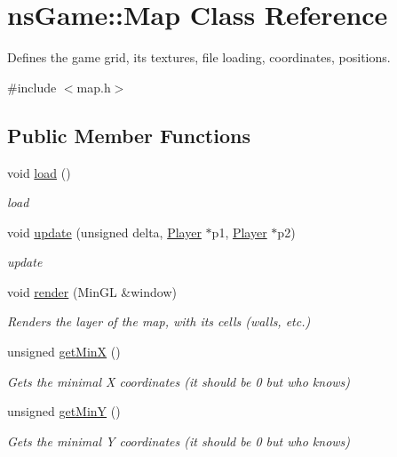 \hypertarget{classns_game_1_1_map}{}\section{ns\+Game\+:\+:Map Class Reference}
\label{classns_game_1_1_map}


Defines the game grid, its textures, file loading, coordinates, positions.  




{\ttfamily \#include $<$map.\+h$>$}

\subsection*{Public Member Functions}
\begin{DoxyCompactItemize}
\item 
void \hyperlink{classns_game_1_1_map_a11fd1b88b5f3c923dad2c88df16e4373}{load} ()
\begin{DoxyCompactList}\small\item\em load \end{DoxyCompactList}\item 
void \hyperlink{classns_game_1_1_map_a2b7108ae33859839be0b85329f729de9}{update} (unsigned delta, \hyperlink{classns_game_1_1_player}{Player} $\ast$p1, \hyperlink{classns_game_1_1_player}{Player} $\ast$p2)
\begin{DoxyCompactList}\small\item\em update \end{DoxyCompactList}\item 
void \hyperlink{classns_game_1_1_map_a3660d6272f910c1b702c4e8f3f463f2b}{render} (Min\+GL \&window)
\begin{DoxyCompactList}\small\item\em Renders the layer of the map, with its cells (walls, etc.) \end{DoxyCompactList}\item 
unsigned \hyperlink{classns_game_1_1_map_ad3a11fea3eca423e6a1784078b379f84}{get\+MinX} ()
\begin{DoxyCompactList}\small\item\em Gets the minimal X coordinates (it should be 0 but who knows) \end{DoxyCompactList}\item 
unsigned \hyperlink{classns_game_1_1_map_a07b09c358fb25b0dea037994e8867d09}{get\+MinY} ()
\begin{DoxyCompactList}\small\item\em Gets the minimal Y coordinates (it should be 0 but who knows) \end{DoxyCompactList}\item 

\end{DoxyCompactItemize}
